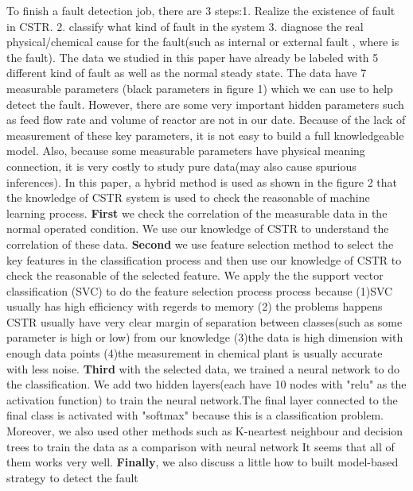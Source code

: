 \documentclass[fleqn,11pt]{wlscirep}
\begin{document}
To finish a fault detection job, there are 3 steps:1. Realize the existence of fault in CSTR. 2. classify what kind of fault in the system 3. diagnose the real physical/chemical cause for the fault(such as internal or external fault , where is the fault). The data we studied in this paper have already be labeled with 5 different kind of fault as well as the normal steady state. The data have 7 measurable parameters (black parameters in figure 1) which we can use to help detect the fault. However, there are some very important hidden parameters such as feed flow rate and volume of reactor  are not in our date. Because of the lack of measurement of these key parameters, it is not easy to build a full knowledgeable model. Also, because some measurable parameters have physical meaning connection, it is very costly to study pure data(may also cause spurious inferences). In this paper, a hybrid method is used as shown in the figure 2 that the knowledge of CSTR  system is used to check the reasonable of machine learning process. \textbf{First} we check the correlation of the measurable data in the normal operated condition. We use our knowledge of CSTR to understand the correlation of these data. \textbf{Second}  we use feature selection method to select the key features in the classification process and then use our knowledge of CSTR to check the reasonable of the selected feature. We apply the the support vector classification (SVC) to do the feature selection process process because (1)SVC usually has high efficiency with regerds to memory (2) the problems happens CSTR usually have very clear margin of separation between classes(such as some parameter is high or low) from our knowledge (3)the data is high dimension with enough data points (4)the measurement in chemical plant is usually accurate with less noise. \textbf{Third} with the selected data, we trained a neural network to do the classification. We add two hidden layers(each have 10 nodes with "relu" as the activation function) to train the neural network.The final layer connected to the final class is activated with "softmax" because this is a classification problem. Moreover, we also used other methods such as K-neartest neighbour and  decision trees to train the data as  a comparison with neural network It seems that all of them works very well.
\textbf{Finally}, we also discuss a little how to built model-based strategy to detect the fault
\end{document}
